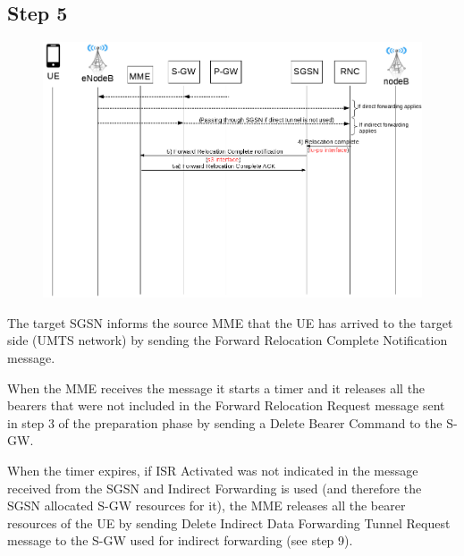 \subsection*{Step 5}
\begin{figure}[!htb]
	\centering
	\includegraphics[width=0.9\linewidth]{img/execution-5.png}
	\label{fig:exec-5}
\end{figure}
The target SGSN informs the source MME that the UE has arrived to the target side
(UMTS network) by sending the Forward Relocation Complete Notification message.

When the MME receives the message it starts a timer and it releases all the bearers
that were not included in the Forward Relocation Request message sent in step 3
of the preparation phase by sending a Delete Bearer Command to the S-GW.

When the timer expires, if ISR Activated was not indicated in the message received
from the SGSN and Indirect Forwarding is used (and therefore the SGSN allocated
S-GW resources for it), the MME releases all the bearer resources of the UE by
sending Delete Indirect Data Forwarding Tunnel Request message to the S-GW used
for indirect forwarding (see step 9).




